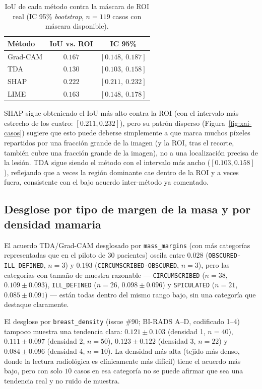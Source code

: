 \begin{table}[H]
\centering
\caption{IoU de cada método contra la máscara de ROI real (IC 95\%
\textit{bootstrap}, $n=119$ casos con máscara disponible).}
\label{tab:xai-vs-roi}
\begin{tabular}{@{}lcc@{}}
\toprule
\textbf{Método} & \textbf{IoU vs. ROI} & \textbf{IC 95\%} \\
\midrule
Grad-CAM & $0.167$ & $[0.148,\ 0.187]$ \\
TDA      & $0.130$ & $[0.103,\ 0.158]$ \\
SHAP     & $0.222$ & $[0.211,\ 0.232]$ \\
LIME     & $0.163$ & $[0.148,\ 0.178]$ \\
\bottomrule
\end{tabular}
\end{table}

SHAP sigue obteniendo el IoU más alto contra la ROI (con el intervalo más
estrecho de los cuatro: $[0.211, 0.232]$), pero su patrón disperso
(Figura~\ref{fig:xai-casos}) sugiere que esto puede deberse simplemente a
que marca muchos píxeles repartidos por una fracción grande de la imagen (y
la ROI, tras el recorte, también cubre una fracción grande de la imagen),
no a una localización precisa de la lesión. TDA sigue siendo el método con
el intervalo más ancho ($[0.103, 0.158]$), reflejando que a veces la región
dominante cae dentro de la ROI y a veces fuera, consistente con el bajo
acuerdo inter-método ya comentado.

\subsection{Desglose por tipo de margen de la masa y por densidad mamaria}
El acuerdo TDA/Grad-CAM desglosado por \texttt{mass\_margins} (con más
categorías representadas que en el piloto de 30 pacientes) oscila entre
$0.028$ (\texttt{OBSCURED-ILL\_DEFINED}, $n=3$) y $0.193$
(\texttt{CIRCUMSCRIBED-OBSCURED}, $n=3$), pero las categorías con tamaño de
muestra razonable --- \texttt{CIRCUMSCRIBED} ($n=38$, $0.109\pm0.093$),
\texttt{ILL\_DEFINED} ($n=26$, $0.098\pm0.096$) y \texttt{SPICULATED}
($n=21$, $0.085\pm0.091$) --- están todas dentro del mismo rango bajo, sin
una categoría que destaque claramente.

El desglose por \texttt{breast\_density} (issue \#90; BI-RADS A--D,
codificado 1--4) tampoco muestra una tendencia clara: $0.121\pm0.103$
(densidad 1, $n=40$), $0.111\pm0.097$ (densidad 2, $n=50$),
$0.123\pm0.122$ (densidad 3, $n=22$) y $0.084\pm0.096$ (densidad 4,
$n=10$). La densidad más alta (tejido más denso, donde la lectura
radiológica es clínicamente más difícil) tiene el acuerdo más bajo, pero
con solo $10$ casos en esa categoría no se puede afirmar que sea una
tendencia real y no ruido de muestra.

